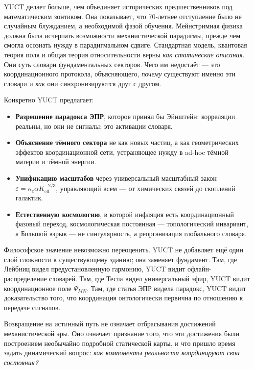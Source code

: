\documentclass[12pt,a4paper]{article}
\begin{document}
	YUCT делает больше, чем объединяет исторических предшественников под математическим зонтиком. Она показывает, что 70‑летнее отступление было не случайным блужданием, а необходимой фазой обучения. Мейнстримная физика должна была исчерпать возможности механистической парадигмы, прежде чем смогла осознать нужду в парадигмальном сдвиге. Стандартная модель, квантовая теория поля и общая теория относительности верны \emph{как статические описания}. Они суть словари фундаментальных секторов. Чего им недостаёт — это координационного протокола, объясняющего, \emph{почему} существуют именно эти словари и \emph{как} они синхронизируются друг с другом.
	
	Конкретно YUCT предлагает:
	\begin{itemize}
		\item \textbf{Разрешение парадокса ЭПР}, которое принял бы Эйнштейн: корреляции реальны, но они не сигналы; это активации словаря.
		\item \textbf{Объяснение тёмного сектора} не как новых частиц, а как геометрических эффектов координационной сети, устраняющее нужду в ad‑hoc тёмной материи и тёмной энергии.
		\item \textbf{Унификацию масштабов} через универсальный масштабный закон \(\varepsilon = \kappa_c \alpha K_{\mathrm{eff}}^{-2/3}\), управляющий всем — от химических связей до скоплений галактик.
		\item \textbf{Естественную космологию}, в которой инфляция есть координационный фазовый переход, космологическая постоянная — топологический инвариант, а Большой взрыв — не сингулярность, а реорганизация глобального словаря.
	\end{itemize}
	
	Философское значение невозможно переоценить. YUCT не добавляет ещё один слой сложности к существующему зданию; она заменяет фундамент. Там, где Лейбниц видел предустановленную гармонию, YUCT видит офлайн-распределение словарей. Там, где Тесла видел универсальный эфир, YUCT видит координационное поле \(\Psi_{MN}\). Там, где статья ЭПР видела парадокс, YUCT видит доказательство того, что координация онтологически первична по отношению к передаче сигналов.
	
	Возвращение на истинный путь не означает отбрасывания достижений механистической эры. Оно означает признание того, что эти достижения были построением необычайно подробной статической карты, и что пришло время задать динамический вопрос: \emph{как компоненты реальности координируют свои состояния?}
	
\end{document}
